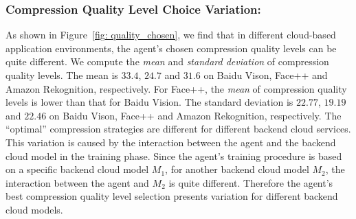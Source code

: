 \subsubsection{Compression Quality Level Choice Variation:}

\textcolor{revise}{As shown in Figure~\ref{fig: quality_chosen}, we find that in different cloud-based application environments, the agent's chosen compression quality levels can be quite different. We compute the \emph{mean} and \emph{standard deviation} of compression quality levels. The mean is $33.4$, $24.7$ and $31.6$ on Baidu Vison, Face++ and Amazon Rekognition, respectively. For Face++, the \emph{mean} of compression quality levels is lower than that for Baidu Vision. The standard deviation is $22.77$, $19.19$ and $22.46$ on Baidu Vison, Face++ and Amazon Rekognition, respectively.} The ``optimal'' compression strategies are different for different backend cloud services. This variation is caused by the interaction between the agent and the backend cloud model in the training phase. Since the agent's training procedure is based on a specific backend cloud model $ M_1 $, for another backend cloud model $ M_2 $, the interaction between the agent and $ M_2 $ is quite different. Therefore the agent's best compression quality level selection presents variation for different backend cloud models.


